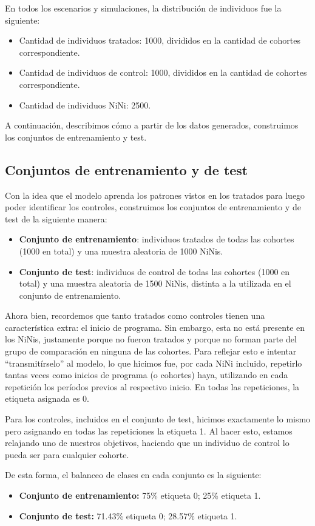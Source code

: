 \documentclass[../../main.tex]{subfiles}
\begin{document}
En todos los escenarios y simulaciones, la distribución de individuos fue la siguiente:
\begin{itemize}[noitemsep]
    \item Cantidad de individuos tratados: 1000, divididos en la cantidad de cohortes
    correspondiente.
    \item Cantidad de individuos de control: 1000, divididos en la cantidad de cohortes
    correspondiente.
    \item Cantidad de individuos NiNi: 2500.
\end{itemize}

A continuación, describimos cómo a partir de los datos generados, construimos los conjuntos
de entrenamiento y test.

\subsection{Conjuntos de entrenamiento y de test}
Con la idea que el modelo aprenda los patrones vistos en los tratados para luego poder
identificar los controles, construimos los conjuntos de entrenamiento y de test de la
siguiente manera:
\begin{itemize}
    \item \textbf{Conjunto de entrenamiento}: individuos tratados de todas las cohortes
    (1000 en total) y una muestra aleatoria de 1000 NiNis.
    \item \textbf{Conjunto de test}: individuos de control de todas las cohortes (1000 en
    total) y una muestra aleatoria de 1500 NiNis, distinta a la utilizada en el conjunto
    de entrenamiento.
\end{itemize}

Ahora bien, recordemos que tanto tratados como controles tienen una característica extra:
el inicio de programa. Sin embargo, esta no está presente en los NiNis, justamente porque
no fueron tratados y porque no forman parte del grupo de comparación en ninguna de las
cohortes. Para reflejar esto e intentar ``transmitírselo'' al modelo, lo que hicimos fue,
por cada NiNi incluido, repetirlo tantas veces como inicios de programa (o cohortes) haya,
utilizando en cada repetición los períodos previos al respectivo inicio. En todas las
repeticiones, la etiqueta asignada es 0.

Para los controles, incluidos en el conjunto de test, hicimos exactamente lo mismo pero
asignando en todas las repeticiones la etiqueta 1. Al hacer esto, estamos relajando uno de
nuestros objetivos, haciendo que un individuo de control lo pueda ser para cualquier
cohorte.

De esta forma, el balanceo de clases en cada conjunto es la siguiente:
\begin{itemize}[itemsep=0.1cm]
    \item \textbf{Conjunto de entrenamiento: } 75\% etiqueta 0; 25\% etiqueta 1.
    \item \textbf{Conjunto de test: } 71.43\% etiqueta 0; 28.57\% etiqueta 1.
\end{itemize}
\end{document}
